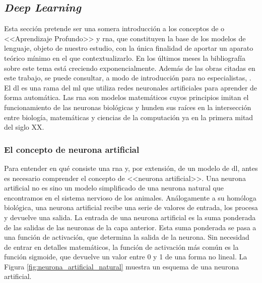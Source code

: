 \subsection{\emph{Deep Learning}}

Esta sección pretende ser una somera introducción a los conceptos de  o <<Aprendizaje Profundo>> y \gls{rna}, que constituyen la base de los modelos de lenguaje, objeto de nuestro estudio, con la única finalidad de aportar un aparato teórico mínimo en el que contextualizarlo. En los últimos meses la bibliografía sobre este tema está creciendo exponencialmente. Además de las obras citadas en este trabajo, se puede consultar, a modo de introducción para no especialistas, \cite{BeginnerGuideNeural}. El \gls{dl} es una rama del \gls{ml} que utiliza redes neuronales artificiales para aprender de forma automática. Las \gls{rna} son modelos matemáticos cuyos principios imitan el funcionamiento de las neuronas biológicas y hunden sus raíces en la intersección entre biología, matemáticas y ciencias de la computación ya en la primera mitad del siglo XX.

\subsubsection{El concepto de neurona artificial}

Para entender en qué consiste una \gls{rna} y, por extensión, de un modelo de \gls{dl}, antes es necesario comprender el concepto de <<neurona artificial>>. Una neurona artificial no es sino un modelo simplificado de una neurona natural que encontramos en el sistema nervioso de los animales. Análogamente a su homóloga biológica, una neurona artificial recibe una serie de valores de entrada, los procesa y devuelve una salida. La entrada de una neurona artificial es la suma ponderada de las salidas de las neuronas de la capa anterior. Esta suma ponderada se pasa a una función de activación, que determina la salida de la neurona. Sin necesidad de entrar en detalles matemáticos, la función de activación más común es la función sigmoide, que devuelve un valor entre 0 y 1 de una forma no lineal. La Figura \ref{fig:neurona_artificial_natural} muestra un esquema de una neurona artificial. 

